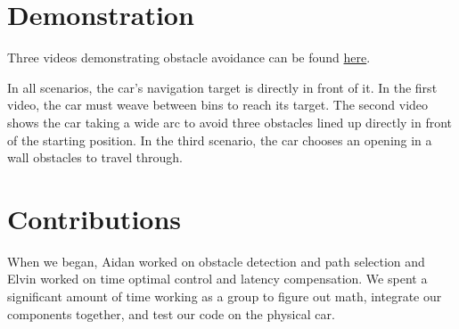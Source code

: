 \documentclass[11pt]{article}
\begin{document}
\section{Demonstration}
Three videos demonstrating obstacle avoidance can be found
\href{https://drive.google.com/drive/folders/1Z8qGX_YRjMb96KEpW027cGvmGeLOB8BU}{here}.

\noindent
In all scenarios, the car's navigation target is directly in front of it. In the
first video, the car must weave between bins to reach its target. The second
video shows the car taking a wide arc to avoid three obstacles lined up directly
in front of the starting position. In the third scenario, the car chooses an
opening in a wall obstacles to travel through.

\section{Contributions}

When we began, Aidan worked on obstacle detection and path selection and Elvin
worked on time optimal control and latency compensation. We spent a significant
amount of time working as a group to figure out math, integrate our
components together, and test our code on the physical car.
\end{document}
